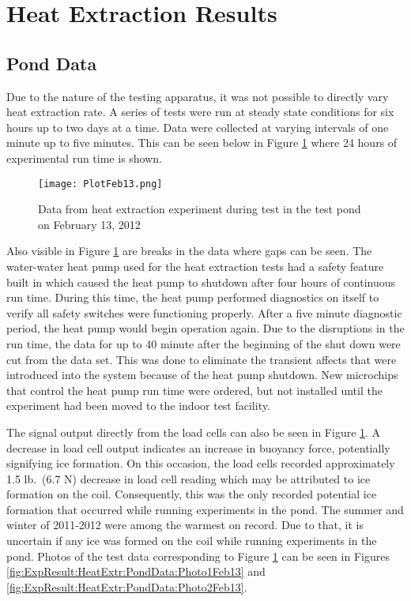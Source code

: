 \section{Heat Extraction Results}
\label{sec:ExpResult:HeatExtr}
	
	
	\subsection{Pond Data}
	\label{subsec:ExpResult:HeatExtr:PondData}
	
Due to the nature of the testing apparatus, it was not possible to directly vary heat extraction rate. A series of tests were run at steady state conditions for six hours up to two days at a time. Data were collected at varying intervals of one minute up to five minutes. This can be seen below in Figure \ref{fig:ExpResult:HeatExtr:PondData:PlotFeb13} where 24 hours of experimental run time is shown. 

	\begin{figure}
		\centering
		\texttt{[image: PlotFeb13.png]}
		\caption[Data from heat extraction experiment in test pond]{Data from heat extraction experiment during test in the test pond on February 13, 2012}
		\label{fig:ExpResult:HeatExtr:PondData:PlotFeb13}
	\end{figure}	
	
Also visible in Figure  \ref{fig:ExpResult:HeatExtr:PondData:PlotFeb13} are breaks in the data where gaps can be seen. The water-water heat pump used for the heat extraction tests had a safety feature built in which caused the heat pump to shutdown after four hours of continuous run time. During this time, the heat pump performed diagnostics on itself to verify all safety switches were functioning properly. After a five minute diagnostic period, the heat pump would begin operation again. Due to the disruptions in the run time, the data for up to 40 minute after the beginning of the shut down were cut from the data set. This was done to eliminate the transient affects that were introduced into the system because of the heat pump shutdown. New microchips that control the heat pump run time were ordered, but not installed until the experiment had been moved to the indoor test facility.


The signal output directly from the load cells can also be seen in Figure \ref{fig:ExpResult:HeatExtr:PondData:PlotFeb13}. A decrease in load cell output indicates an increase in buoyancy force, potentially signifying ice formation. On this occasion, the load cells recorded approximately 1.5 lb.\ (6.7 N) decrease in load cell reading which may be attributed to ice formation on the coil. Consequently, this was the only recorded potential ice formation that occurred while running experiments in the pond. The summer and winter of 2011-2012 were among the warmest on record. Due to that, it is uncertain if any ice was formed on the coil while running experiments in the pond. Photos of the test data corresponding to Figure \ref{fig:ExpResult:HeatExtr:PondData:PlotFeb13} can be seen in Figures \ref{fig:ExpResult:HeatExtr:PondData:Photo1Feb13} and \ref{fig:ExpResult:HeatExtr:PondData:Photo2Feb13}.
	

